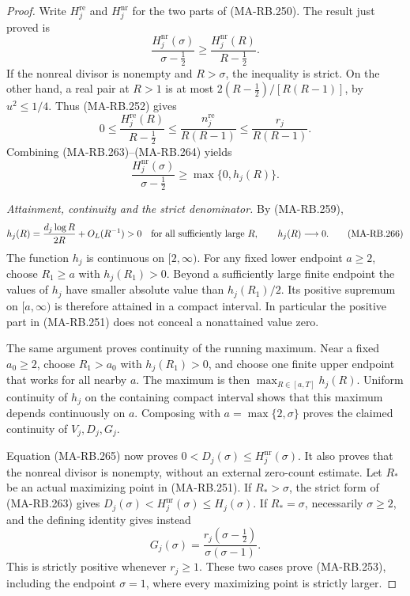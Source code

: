 \begin{proof}
Write \(H_j^{\mathrm{re}}\) and \(H_j^{\mathrm{nr}}\)
for the two parts of (MA-RB.250). The result just proved is
\[
 \frac{H_j^{\mathrm{nr}}(\sigma)}{\sigma-\tfrac12}
       \ge\frac{H_j^{\mathrm{nr}}(R)}{R-\tfrac12}.
 \tag{MA-RB.263}
\]
If the nonreal divisor is nonempty and \(R>\sigma\),
the inequality is strict. On the other hand, a real pair
at \(R>1\) is at most
\(2(R-\tfrac12)/[R(R-1)]\), by \(u^2\le1/4\).
Thus (MA-RB.252) gives
\[
 0\le\frac{H_j^{\mathrm{re}}(R)}{R-\tfrac12}
       \le\frac{n_j^{\mathrm{re}}}{R(R-1)}
       \le\frac{r_j}{R(R-1)}.
 \tag{MA-RB.264}
\]
Combining (MA-RB.263)--(MA-RB.264) yields
\[
 \frac{H_j^{\mathrm{nr}}(\sigma)}{\sigma-\tfrac12}
                    \ge\max\{0,h_j(R)\}.
 \tag{MA-RB.265}
\]

\emph{Attainment, continuity and the strict denominator.}
By (MA-RB.259),
\[
 h_j(R)=\frac{d_j\log R}{2R}+O_L(R^{-1})>0
       \quad\hbox{for all sufficiently large }R,
       \qquad h_j(R)\longrightarrow0.
 \tag{MA-RB.266}
\]
The function \(h_j\) is continuous on \([2,\infty)\).
For any fixed lower endpoint \(a\ge2\), choose
\(R_1\ge a\) with \(h_j(R_1)>0\). Beyond a sufficiently
large finite endpoint the values of \(h_j\) have smaller
absolute value than \(h_j(R_1)/2\). Its positive supremum
on \([a,\infty)\) is therefore attained in a compact
interval. In particular the positive part in (MA-RB.251)
does not conceal a nonattained value zero.

The same argument proves continuity of the running maximum.
Near a fixed \(a_0\ge2\), choose \(R_1>a_0\) with
\(h_j(R_1)>0\), and choose one finite upper endpoint
that works for all nearby \(a\). The maximum is then
\(\max_{R\in[a,T]}h_j(R)\). Uniform continuity of \(h_j\)
on the containing compact interval shows that this maximum
depends continuously on \(a\). Composing with
\(a=\max\{2,\sigma\}\) proves the claimed continuity
of \(V_j,D_j,G_j\).

Equation (MA-RB.265) now proves
\(0<D_j(\sigma)\le H_j^{\mathrm{nr}}(\sigma)\).
It also proves that the nonreal divisor is nonempty,
without an external zero-count estimate. Let \(R_*\)
be an actual maximizing point in (MA-RB.251).
If \(R_*>\sigma\), the strict form of (MA-RB.263) gives
\(D_j(\sigma)<H_j^{\mathrm{nr}}(\sigma)\le H_j(\sigma)\).
If \(R_*=\sigma\), necessarily \(\sigma\ge2\), and
the defining identity gives instead
\[
 G_j(\sigma)=\frac{r_j(\sigma-\tfrac12)}{\sigma(\sigma-1)}.
 \tag{MA-RB.267}
\]
This is strictly positive whenever \(r_j\ge1\).
These two cases prove (MA-RB.253), including the endpoint
\(\sigma=1\), where every maximizing point is strictly larger.


\end{proof}

